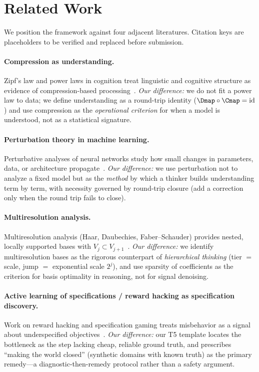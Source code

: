 \section{Related Work}
\label{sec:related}

We position the framework against four adjacent literatures. Citation keys are
placeholders to be verified and replaced before submission.

\paragraph{Compression as understanding.}
Zipf's law and power laws in cognition treat linguistic and cognitive structure
as evidence of compression-based processing~\cite{zipf_cognition}. \emph{Our
difference:} we do not fit a power law to data; we define understanding as a
round-trip identity ($\Dmap\circ\Cmap=\mathrm{id}$) and use compression as the
\emph{operational criterion} for when a model is understood, not as a statistical
signature.

\paragraph{Perturbation theory in machine learning.}
Perturbative analyses of neural networks study how small changes in parameters,
data, or architecture propagate~\cite{perturbation_ml}. \emph{Our difference:}
we use perturbation not to analyze a fixed model but as the \emph{method} by
which a thinker builds understanding term by term, with necessity governed by
round-trip closure (add a correction only when the round trip fails to close).

\paragraph{Multiresolution analysis.}
Multiresolution analysis (Haar, Daubechies, Faber--Schauder) provides nested,
locally supported bases with $V_j\subset V_{j+1}$~\cite{mra_daubechies}.
\emph{Our difference:} we identify multiresolution bases as the rigorous
counterpart of \emph{hierarchical thinking} (tier $=$ scale, jump $=$
exponential scale $2^j$), and use sparsity of coefficients as the criterion for
basis optimality in reasoning, not for signal denoising.

\paragraph{Active learning of specifications / reward hacking as specification discovery.}
Work on reward hacking and specification gaming treats misbehavior as a signal
about underspecified objectives~\cite{reward_hacking_spec}. \emph{Our
difference:} our T5 template locates the bottleneck as the step lacking cheap,
reliable ground truth, and prescribes ``making the world closed'' (synthetic
domains with known truth) as the primary remedy---a diagnostic-then-remedy
protocol rather than a safety argument.
